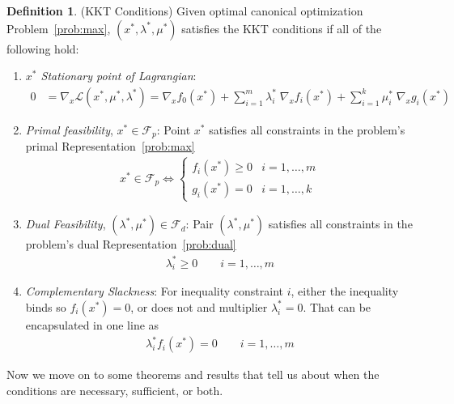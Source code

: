 \documentclass[12pt]{book}
\numberwithin{equation}{section} %
\theoremstyle{plain}
\theoremstyle{definition}
\newtheorem{defn}[thm]{Definition}
\theoremstyle{remark}
\newcommand{\sL}{\mathscr{L}}
\begin{document}

\begin{defn}{(KKT Conditions)}
Given optimal canonical optimization Problem~\ref{prob:max},
$(x^*,\lambda^*,\mu^*)$ satisfies the KKT conditions if all of the
following hold:
\begin{enumerate}
  \item \emph{$x^*$ Stationary point of Lagrangian}:
    \begin{align*}
      0 &= \nabla_x \sL(x^*,\mu^*,\lambda^*)
        = \nabla_x f_0(x^*)
        + \sum^m_{i=1} \lambda_i^* \; \nabla_x f_i(x^*)
        + \sum^k_{i=1} \mu_i^* \; \nabla_xg_i(x^*)
    \end{align*}
  \item \emph{Primal feasibility}, $x^*\in \mathscr{F}_p$:
    Point $x^*$ satisfies all constraints in the problem's primal
    Representation~\ref{prob:max}
    \begin{align*}
      x^*\in \mathscr{F}_p
      \iff
      \begin{cases}
        f_i(x^*)\geq 0 & i = 1,\ldots,m\\
        g_i(x^*)= 0 & i = 1,\ldots,k
      \end{cases}
    \end{align*}

  \item \emph{Dual Feasibility}, $(\lambda^*,\mu^*)\in\mathscr{F}_d$:
    Pair $(\lambda^*,\mu^*)$ satisfies all constraints in the problem's
    dual Representation~\ref{prob:dual}
    \begin{align*}
      \lambda^*_i \geq 0
      \qquad i=1,\ldots,m
    \end{align*}

  \item \emph{Complementary Slackness}:
    For inequality constraint $i$, either the inequality binds so
    $f_i(x^*)=0$, or does not and multiplier $\lambda^*_i=0$.
    That can be encapsulated in one line as
    \begin{align}
      \label{kkt:slackness}
      \lambda_i^* f_i(x^*) =0
      \qquad i=1,\ldots,m
    \end{align}
\end{enumerate}
Now we move on to some theorems and results that tell us about when the
conditions are necessary, sufficient, or both.
\end{defn}
\end{document}
